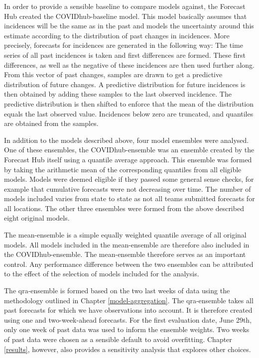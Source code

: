 \documentclass[
]{book}
\begin{document}
In order to provide a sensible baseline to compare models against, the Forecast Hub created the COVIDhub-baseline model. This model basically assumes that incidences will be the same as in the past and models the uncertainty around this estimate according to the distribution of past changes in incidences. More precisely, forecasts for incidences are generated in the following way: The time series of all past incidences is taken and first differences are formed. These first differences, as well as the negative of these incidences are then used further along. From this vector of past changes, samples are drawn to get a predictive distribution of future changes. A predictive distribution for future incidences is then obtained by adding these samples to the last observed incidence. The predictive distribution is then shifted to enforce that the mean of the distribution equals the last observed value. Incidences below zero are truncated, and quantiles are obtained from the samples.

In addition to the models described above, four model ensembles were analysed. One of these ensembles, the COVIDhub-ensemble was an ensemble created by the Forecast Hub itself using a quantile average approach. This ensemble was formed by taking the arithmetic mean of the corresponding quantiles from all eligible models. Models were deemed eligible if they passed some general sense checks, for example that cumulative forecasts were not decreasing over time. The number of models included varies from state to state as not all teams submitted forecasts for all locations. The other three ensembles were formed from the above described eight original models.

The mean-ensemble is a simple equally weighted quantile average of all original models. All models included in the mean-ensemble are therefore also included in the COVIDhub-ensemble. The mean-ensemble therefore serves as an important control. Any performance difference between the two ensembles can be attributed to the effect of the selection of models included for the analysis.

The qra-ensemble is formed based on the two last weeks of data using the methodology outlined in Chapter \ref{model-aggregation}. The qra-ensemble takes all past forecasts for which we have observations into account. It is therefore created using one and two-week-ahead forecasts. For the first evaluation date, June 29th, only one week of past data was used to inform the ensemble weights. Two weeks of past data were chosen as a sensible default to avoid overfitting. Chapter \ref{results}, however, also provides a sensitivity analysis that explores other choices.
\end{document}
